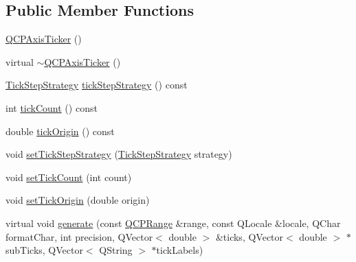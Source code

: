 \subsection*{Public Member Functions}
\begin{DoxyCompactItemize}
\item 
\hyperlink{class_q_c_p_axis_ticker_a8fcf23c79ebd72202fe79253f9f01ea8}{Q\+C\+P\+Axis\+Ticker} ()
\item 
virtual \hyperlink{class_q_c_p_axis_ticker_a1119d6f09ad720f9c5dfdd2559047161}{$\sim$\+Q\+C\+P\+Axis\+Ticker} ()
\item 
\hyperlink{class_q_c_p_axis_ticker_ab6d2f9d9477821623ac9bc4b21ddf49a}{Tick\+Step\+Strategy} \hyperlink{class_q_c_p_axis_ticker_a58df76f2ec3eb48401bdd314b0e14ba1}{tick\+Step\+Strategy} () const
\item 
int \hyperlink{class_q_c_p_axis_ticker_aaf9edbe4169ce55e216fd067cc139452}{tick\+Count} () const
\item 
double \hyperlink{class_q_c_p_axis_ticker_ac0c6e9587c36fdeefb5518c00fe7ab15}{tick\+Origin} () const
\item 
void \hyperlink{class_q_c_p_axis_ticker_a73b1d847c1a12159af6bfda4ebebe7d5}{set\+Tick\+Step\+Strategy} (\hyperlink{class_q_c_p_axis_ticker_ab6d2f9d9477821623ac9bc4b21ddf49a}{Tick\+Step\+Strategy} strategy)
\item 
void \hyperlink{class_q_c_p_axis_ticker_a47752abba8293e6dc18491501ae34008}{set\+Tick\+Count} (int count)
\item 
void \hyperlink{class_q_c_p_axis_ticker_ab509c7e500293bf66a8409f0d7c23943}{set\+Tick\+Origin} (double origin)
\item 
virtual void \hyperlink{class_q_c_p_axis_ticker_aefbd11725678ca824add8cf926cbc856}{generate} (const \hyperlink{class_q_c_p_range}{Q\+C\+P\+Range} \&range, const Q\+Locale \&locale, Q\+Char format\+Char, int precision, Q\+Vector$<$ double $>$ \&ticks, Q\+Vector$<$ double $>$ $\ast$sub\+Ticks, Q\+Vector$<$ Q\+String $>$ $\ast$tick\+Labels)
\end{DoxyCompactItemize}
